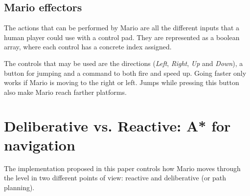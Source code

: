 \documentclass[conference]{IEEEtran}
\begin{document}
\subsection{Mario effectors} \label{subsec:marioBenchEffectors}

The actions that can be performed by Mario are all the different inputs that a
human player could use with a control pad. They are represented as a
boolean array, where each control has a concrete index assigned. 



The controls that may be used are the directions (\textit{Left}, \textit{Right}, 
\textit{Up} and \textit{Down}), a button 
for jumping and a command to both fire and speed up. Going faster only 
works if Mario is moving to the right or left. Jumps while pressing this button also 
make Mario reach farther platforms.


\section{Deliberative vs. Reactive: A* for navigation}

The implementation proposed in this paper controls how Mario moves through the level
in two different points of view: reactive and deliberative (or path planning).
\end{document}
